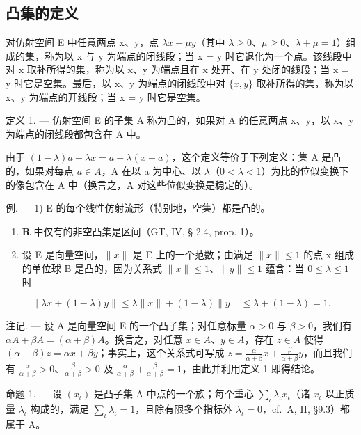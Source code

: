 \subsection{凸集的定义}

对仿射空间 E 中任意两点 x、y，点 \(\lambda x + \mu y\)（其中 \(\lambda \geqslant 0\)、\(\mu \geqslant 0\)、\(\lambda + \mu = 1\)）组成的集，称为以 x 与 y 为端点的闭线段；当 x = y 时它退化为一个点。该线段中对 x 取补所得的集，称为以 x、y 为端点且在 x 处开、在 y 处闭的线段；当 x = y 时它是空集。最后，以 x、y 为端点的闭线段中对 \(\{x, y\}\) 取补所得的集，称为以 x、y 为端点的开线段；当 x = y 时它是空集。

定义 1. --- 仿射空间 E 的子集 A 称为凸的，如果对 A 的任意两点 x、y，以 x、y 为端点的闭线段都包含在 A 中。

由于 \((1 - \lambda)a + \lambda x = a + \lambda(x - a)\)，这个定义等价于下列定义：集 A 是凸的，如果对每点 \(a \in A\)，A 在以 a 为中心、以 \(\lambda\)（\(0 < \lambda < 1\)）为比的位似变换下的像包含在 A 中（换言之，A 对这些位似变换是稳定的）。

例. --- 1) E 的每个线性仿射流形（特别地，空集）都是凸的。

\begin{enumerate}
\def\labelenumi{\arabic{enumi})}
\setcounter{enumi}{1}
\item
  \(\mathbf{R}\) 中仅有的非空凸集是区间（GT, IV, § 2.4, prop. 1）。
\item
  设 E 是向量空间，\(\|x\|\) 是 E 上的一个范数；由满足 \(\| x\| \leqslant 1\) 的点 x 组成的单位球 B 是凸的，因为关系式 \(\| x\| \leqslant 1\)、\(\| y\| \leqslant 1\) 蕴含：当 \(0\leqslant \lambda \leqslant 1\) 时
\end{enumerate}

\[
\left\| \lambda x + (1 - \lambda) y \right\| \leqslant \lambda \| x \| + (1 - \lambda) \| y \| \leqslant \lambda + (1 - \lambda) = 1.
\]

注记. --- 设 A 是向量空间 E 的一个凸子集；对任意标量 \(\alpha > 0\) 与 \(\beta > 0\)，我们有 \(\alpha A + \beta A = (\alpha + \beta) A\)。换言之，对任意 \(x \in A\)、\(y \in A\)，存在 \(z \in A\) 使得 \((\alpha + \beta) z = \alpha x + \beta y\)；事实上，这个关系式可写成 \(z = \frac{\alpha}{\alpha + \beta} x + \frac{\beta}{\alpha + \beta} y\)，而且我们有 \(\frac{\alpha}{\alpha + \beta} > 0\)、\(\frac{\beta}{\alpha + \beta} > 0\) 及 \(\frac{\alpha}{\alpha + \beta} + \frac{\beta}{\alpha + \beta} = 1\)，由此并利用定义 1 即得结论。

命题 1. --- 设 \((x_{\iota})\) 是凸子集 A 中点的一个族；每个重心 \(\sum_{\iota} \lambda_{\iota} x_{\iota}\)（诸 \(x_{\iota}\) 以正质量 \(\lambda_{\iota}\) 构成的，满足 \(\sum_{\iota} \lambda_{\iota} = 1\)，且除有限多个指标外 \(\lambda_{\iota} = 0\)，cf.~A, II, §9.3）都属于 A。


